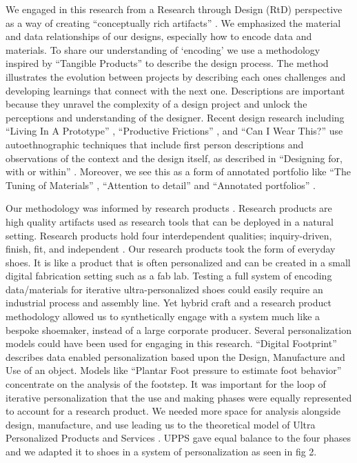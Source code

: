 We engaged in this research from a Research through Design (RtD) perspective as a way of creating ``conceptually rich artifacts'' \cite{Gaver2012a}. We emphasized the material and data relationships of our designs, especially how to encode data and materials. To share our understanding of `encoding' we use a methodology inspired by ``Tangible Products'' \cite{Djajadiningrat2004} to describe the design process. The method illustrates the evolution between projects by describing each ones challenges and developing learnings that connect with the next one. Descriptions are important because they unravel the complexity of a design project and unlock the perceptions and understanding of the designer. Recent design research including ``Living In A Prototype'' \cite{Desjardins2016}, ``Productive Frictions'' \cite{Wakkary2016}, and ``Can I Wear This?'' \cite{mackey2017can} use autoethnographic techniques that include first person descriptions and observations of the context and the design itself, as described in ``Designing for, with or within'' \cite{Tomico2012}. Moreover, we see this as a form of annotated portfolio like ``The Tuning of Materials'' \cite{Karana2016}, ``Attention to detail'' \cite{Jarvis2012} and ``Annotated portfolios'' \cite{Gaver2012}.

Our methodology was informed by research products \cite{Odom2016}. Research products are high quality artifacts used as research tools that can be deployed in a natural setting. Research products hold four interdependent qualities; inquiry-driven, finish, fit, and independent \cite{Odom2016}. Our research products took the form of everyday shoes. It is like a product that is often personalized and can be created in a small digital fabrication setting such as a fab lab. Testing a full system of encoding data/materials for iterative ultra-personalized shoes could easily require an industrial process and assembly line. Yet hybrid craft and a research product methodology allowed us to synthetically engage with a system much like a bespoke shoemaker, instead of a large corporate producer.
Several personalization models could have been used for engaging in this research. ``Digital Footprint'' \cite{Benford2015} describes data enabled personalization based upon the Design, Manufacture and Use of an object. Models like ``Plantar Foot pressure to estimate foot behavior'' \cite{Hagman2005} concentrate on the analysis of the footstep. It was important for the loop of iterative personalization that the use and making phases were equally represented to account for a research product. We needed more space for analysis alongside design, manufacture, and use leading us to the theoretical model of Ultra Personalized Products and Services \cite{stolwijk2018going}. UPPS gave equal balance to the four phases and we adapted it to shoes in a system of personalization as seen in fig 2. 

